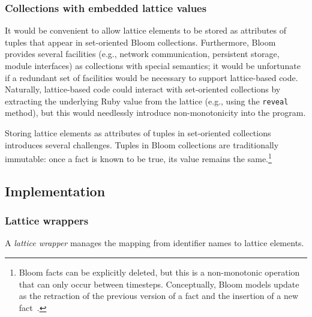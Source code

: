\subsubsection{Collections with embedded lattice values}
It would be convenient to allow lattice elements to be stored as attributes of
tuples that appear in set-oriented Bloom collections. Furthermore, Bloom
provides several facilities (e.g., network communication, persistent storage,
module interfaces) as collections with special semantics; it would be
unfortunate if a redundant set of facilities would be necessary to support
lattice-based code. Naturally, lattice-based \lang code could interact with
set-oriented collections by extracting the underlying Ruby value from the
lattice (e.g., using the \texttt{reveal} method), but this would needlessly
introduce non-monotonicity into the program.

Storing lattice elements as attributes of tuples in set-oriented collections
introduces several challenges. Tuples in Bloom collections are traditionally
immutable: once a fact is known to be true, its value remains the
same.\footnote{Bloom facts can be explicitly deleted, but this is a
  non-monotonic operation that can only occur between timesteps. Conceptually,
  Bloom models update as the retraction of the previous version of a fact and
  the insertion of a new fact~\cite{dedalus}.}

\subsection{Implementation}

\subsubsection{Lattice wrappers}
A \emph{lattice wrapper} manages the mapping from identifier names to lattice
elements.

